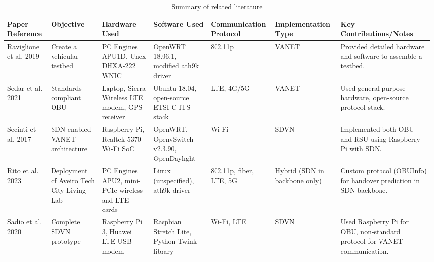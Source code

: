     \begin{table}[ht]
        \centering
        \begin{tabular}{|p{1.5cm}|p{1.7cm}|p{2cm}|p{1.6cm}|p{1.6cm}|p{1.8cm}|p{2.5cm}|}
        \hline
        \textbf{Paper Reference} & \textbf{Objective} & \textbf{Hardware Used} & \textbf{Software Used} & \textbf{Commu\-nication Protocol} & \textbf{Imple\-mentation Type} & \textbf{Key Contributions/Notes} \\ \hline
        
        Raviglione et al. 2019\cite{raviglione_open_2019} & Create a vehicular testbed & PC Engines APU1D, Unex DHXA-222 WNIC & OpenWRT 18.06.1, modified ath9k driver & 802.11p & VANET & Provided detailed hardware and software to assemble a testbed. \\ \hline
        
        Sedar et al. 2021\cite{sedar_standards-compliant_2021} & Standards-compliant OBU & Laptop, Sierra Wireless LTE modem, GPS receiver & Ubuntu 18.04, open-source ETSI C-ITS stack & LTE, 4G/5G & VANET & Used general-purpose hardware, open-source protocol stack. \\ \hline
        
        Secinti et al. 2017\cite{secinti_software_2017} & SDN-enabled VANET architecture & Raspberry Pi, Realtek 5370 Wi-Fi SoC & OpenWRT, OpenvSwitch v2.3.90, OpenDaylight & Wi-Fi & SDVN & Implemented both OBU and RSU using Raspberry Pi with SDN. \\ \hline
        
        Rito et al. 2023\cite{rito_aveiro_2023} & Deployment of Aveiro Tech City Living Lab & PC Engines APU2, mini-PCIe wireless and LTE cards & Linux (unspecified), ath9k driver & 802.11p, fiber, LTE, 5G & Hybrid (SDN in backbone only) & Custom protocol (OBUInfo) for handover prediction in SDN backbone. \\ \hline
        
        Sadio et al. 2020\cite{sadio_design_2020} & Complete SDVN prototype & Raspberry Pi 3, Huawei LTE USB modem & Raspbian Stretch Lite, Python Twink library & Wi-Fi, LTE & SDVN & Used Raspberry Pi for OBU, non-standard protocol for VANET communication. \\ \hline
        
        \end{tabular}
        \caption{Summary of related literature}
    \end{table}
        